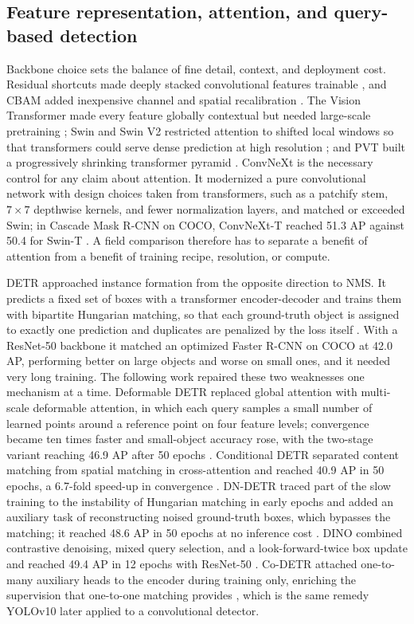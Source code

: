 \subsection{Feature representation, attention, and query-based detection}

Backbone choice sets the balance of fine detail, context, and deployment cost. Residual shortcuts made deeply stacked convolutional features trainable \cite{he2016resnet}, and CBAM added inexpensive channel and spatial recalibration \cite{woo2018cbam}. The Vision Transformer made every feature globally contextual but needed large-scale pretraining \cite{dosovitskiy2021vit}; Swin and Swin V2 restricted attention to shifted local windows so that transformers could serve dense prediction at high resolution \cite{liu2021swin,liu2022swinv2}; and PVT built a progressively shrinking transformer pyramid \cite{wang2021pvt}. ConvNeXt is the necessary control for any claim about attention. It modernized a pure convolutional network with design choices taken from transformers, such as a patchify stem, $7\times7$ depthwise kernels, and fewer normalization layers, and matched or exceeded Swin; in Cascade Mask R-CNN on COCO, ConvNeXt-T reached 51.3 AP against 50.4 for Swin-T \cite{liu2022convnext}. A field comparison therefore has to separate a benefit of attention from a benefit of training recipe, resolution, or compute.

DETR approached instance formation from the opposite direction to NMS. It predicts a fixed set of boxes with a transformer encoder-decoder and trains them with bipartite Hungarian matching, so that each ground-truth object is assigned to exactly one prediction and duplicates are penalized by the loss itself \cite{carion2020detr}. With a ResNet-50 backbone it matched an optimized Faster R-CNN on COCO at 42.0 AP, performing better on large objects and worse on small ones, and it needed very long training. The following work repaired these two weaknesses one mechanism at a time. Deformable DETR replaced global attention with multi-scale deformable attention, in which each query samples a small number of learned points around a reference point on four feature levels; convergence became ten times faster and small-object accuracy rose, with the two-stage variant reaching 46.9 AP after 50 epochs \cite{zhu2021deformabledetr}. Conditional DETR separated content matching from spatial matching in cross-attention and reached 40.9 AP in 50 epochs, a 6.7-fold speed-up in convergence \cite{meng2021conditionaldetr}. DN-DETR traced part of the slow training to the instability of Hungarian matching in early epochs and added an auxiliary task of reconstructing noised ground-truth boxes, which bypasses the matching; it reached 48.6 AP in 50 epochs at no inference cost \cite{li2022dndetr}. DINO combined contrastive denoising, mixed query selection, and a look-forward-twice box update and reached 49.4 AP in 12 epochs with ResNet-50 \cite{zhang2023dino}. Co-DETR attached one-to-many auxiliary heads to the encoder during training only, enriching the supervision that one-to-one matching provides \cite{zong2023codetr}, which is the same remedy YOLOv10 later applied to a convolutional detector.

